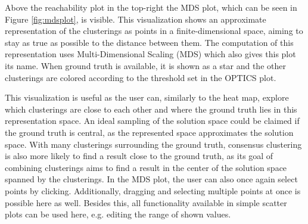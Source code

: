 \documentclass[
	a4paper,
	english,
	twoside,
	openright,               
	11pt                            
	]{report}
\begin{document}
Above the reachability plot in the top-right the MDS plot, which can be seen in Figure \ref{fig:mdsplot}, is visible. This visualization shows an approximate representation of the clusterings as points in a finite-dimensional space, aiming to stay as true as possible to the distance between them. The computation of this representation uses Multi-Dimensional Scaling (MDS) \cite{mds} which also gives this plot its name. When ground truth is available, it is shown as a star and the other clusterings are colored according to the threshold set in the OPTICS plot. 

This visualization is useful as the user can, similarly to the heat map, explore which clusterings are close to each other and where the ground truth lies in this representation space. An ideal sampling of the solution space could be claimed if the ground truth is central, as the represented space approximates the solution space. With many clusterings surrounding the ground truth, consensus clustering is also more likely to find a result close to the ground truth, as its goal of combining clusterings aims to find a result in the center of the solution space spanned by the clusterings. In the MDS plot, the user can also once again select points by clicking. Additionally, dragging and selecting multiple points at once is possible here as well. Besides this, all functionality available in simple scatter plots can be used here, e.g. editing the range of shown values.
\end{document}
